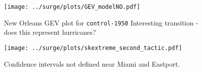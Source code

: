 \begin{figure*}[htb!]
    \centering
    \texttt{[image: ../surge/plots/GEV\_modelNO.pdf]}
   \caption{New Orleans GEV plot for \texttt{control-1950} Interesting transition
            - does this represent hurricanes?}
    \label{fig:gev-no}
    \texttt{[image: ../surge/plots/skextreme\_second\_tactic.pdf]}
    \vspace{-15pt}
   \caption{Confidence intervals not defined near Miami and Eastport. }
    \label{fig:gev_all_points}
\end{figure*}
